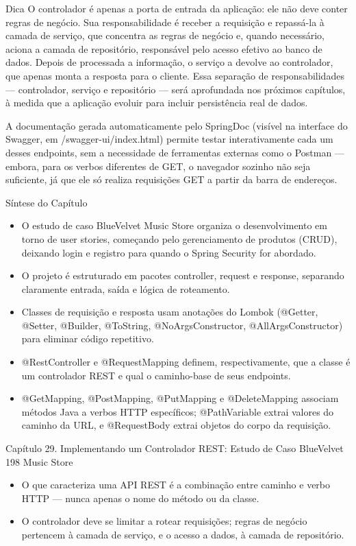 \begin{infobox}{Dica}
O controlador é apenas a porta de entrada da aplicação: ele não deve conter regras de negócio. Sua responsabilidade é receber a requisição e repassá-la à camada de serviço, que concentra as regras de negócio e, quando necessário, aciona a camada de repositório, responsável pelo acesso efetivo ao banco de dados. Depois de processada a informação, o serviço a devolve ao controlador, que apenas monta a resposta para o cliente. Essa separação de responsabilidades — controlador, serviço e repositório — será aprofundada nos próximos capítulos, à medida que a aplicação evoluir para incluir persistência real de dados.
\end{infobox}

A documentação gerada automaticamente pelo SpringDoc (visível na interface do Swagger, em /swagger-ui/index.html) permite testar interativamente cada um desses endpoints, sem a necessidade de ferramentas externas como o Postman — embora, para os verbos diferentes de GET, o navegador sozinho não seja suficiente, já que ele só realiza requisições GET a partir da barra de endereços.

Síntese do Capítulo

\begin{itemize}
  \item O estudo de caso BlueVelvet Music Store organiza o desenvolvimento em torno de user stories, começando pelo gerenciamento de produtos (CRUD), deixando login e registro para quando o Spring Security for abordado.
  \item O projeto é estruturado em pacotes controller, request e response, separando claramente entrada, saída e lógica de roteamento.
  \item Classes de requisição e resposta usam anotações do Lombok (@Getter, @Setter, @Builder, @ToString, @NoArgsConstructor, @AllArgsConstructor) para eliminar código repetitivo.
  \item @RestController e @RequestMapping definem, respectivamente, que a classe é um controlador REST e qual o caminho-base de seus endpoints.
  \item @GetMapping, @PostMapping, @PutMapping e @DeleteMapping associam métodos Java a verbos HTTP específicos; @PathVariable extrai valores do caminho da URL, e @RequestBody extrai objetos do corpo da requisição.
\end{itemize}

Capítulo 29. Implementando um Controlador REST: Estudo de Caso BlueVelvet 198 Music Store

\begin{itemize}
  \item O que caracteriza uma API REST é a combinação entre caminho e verbo HTTP — nunca apenas o nome do método ou da classe.
\end{itemize}

\begin{itemize}
  \item O controlador deve se limitar a rotear requisições; regras de negócio pertencem à camada de serviço, e o acesso a dados, à camada de repositório.
\end{itemize}
